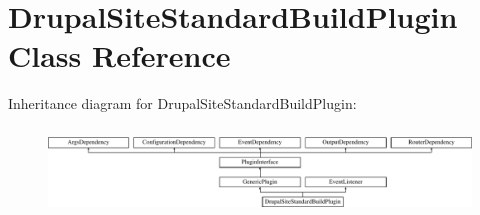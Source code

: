 \hypertarget{classDrupalSiteStandardBuildPlugin}{\section{Drupal\-Site\-Standard\-Build\-Plugin Class Reference}
\label{classDrupalSiteStandardBuildPlugin}
}
Inheritance diagram for Drupal\-Site\-Standard\-Build\-Plugin\-:\begin{figure}[H]
\begin{center}
\leavevmode
\includegraphics[height=2.321244cm]{classDrupalSiteStandardBuildPlugin}
\end{center}
\end{figure}

